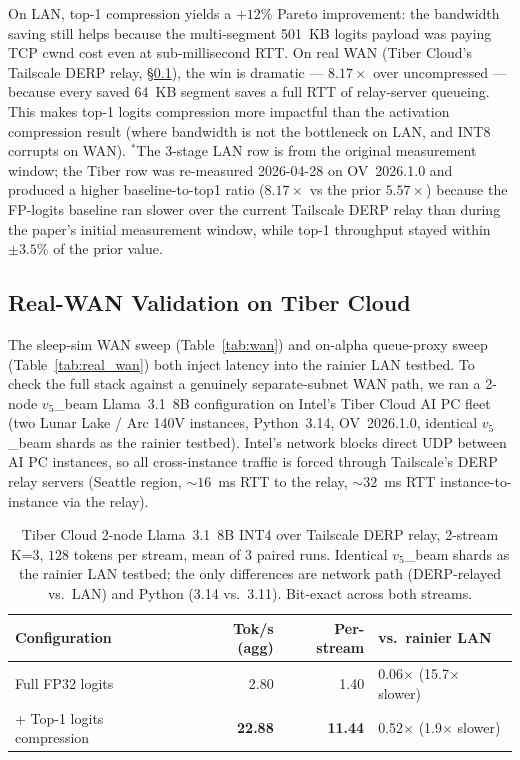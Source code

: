 \documentclass[11pt]{article}
\begin{document}
On LAN, top-1 compression yields a $+12\%$ Pareto improvement: the bandwidth saving still helps because the multi-segment 501~KB logits payload was paying TCP cwnd cost even at sub-millisecond RTT. On real WAN (Tiber Cloud's Tailscale DERP relay, \S\ref{sec:tiber}), the win is dramatic --- $8.17\times$ over uncompressed --- because every saved 64~KB segment saves a full RTT of relay-server queueing. This makes top-1 logits compression more impactful than the activation compression result (where bandwidth is not the bottleneck on LAN, and INT8 corrupts on WAN). $^*$The 3-stage LAN row is from the original measurement window; the Tiber row was re-measured 2026-04-28 on OV~2026.1.0 and produced a higher baseline-to-top1 ratio ($8.17\times$ vs the prior $5.57\times$) because the FP-logits baseline ran slower over the current Tailscale DERP relay than during the paper's initial measurement window, while top-1 throughput stayed within $\pm 3.5\%$ of the prior value.

\subsection{Real-WAN Validation on Tiber Cloud}
\label{sec:tiber}

The sleep-sim WAN sweep (Table~\ref{tab:wan}) and on-alpha queue-proxy sweep (Table~\ref{tab:real_wan}) both inject latency into the rainier LAN testbed. To check the full stack against a genuinely separate-subnet WAN path, we ran a 2-node $v_5$\_beam Llama~3.1~8B configuration on Intel's Tiber Cloud AI PC fleet (two Lunar Lake / Arc 140V instances, Python~3.14, OV~2026.1.0, identical $v_5$\_beam shards as the rainier testbed). Intel's network blocks direct UDP between AI PC instances, so all cross-instance traffic is forced through Tailscale's DERP relay servers (Seattle region, $\sim 16$~ms RTT to the relay, $\sim 32$~ms RTT instance-to-instance via the relay).

\begin{table}[ht]
\centering
\caption{Tiber Cloud 2-node Llama~3.1~8B INT4 over Tailscale DERP relay, 2-stream K=3, $128$ tokens per stream, mean of 3 paired runs. Identical $v_5$\_beam shards as the rainier LAN testbed; the only differences are network path (DERP-relayed vs.\ LAN) and Python (3.14 vs.\ 3.11). Bit-exact across both streams.}
\label{tab:tiber}
\begin{tabular}{@{}lrrl@{}}
\toprule
Configuration & Tok/s (agg) & Per-stream & vs.\ rainier LAN \\
\midrule
Full FP32 logits & 2.80 & 1.40 & 0.06$\times$ (15.7$\times$ slower) \\
+ Top-1 logits compression & \textbf{22.88} & \textbf{11.44} & 0.52$\times$ (1.9$\times$ slower) \\
\bottomrule
\end{tabular}
\end{table}
\end{document}
